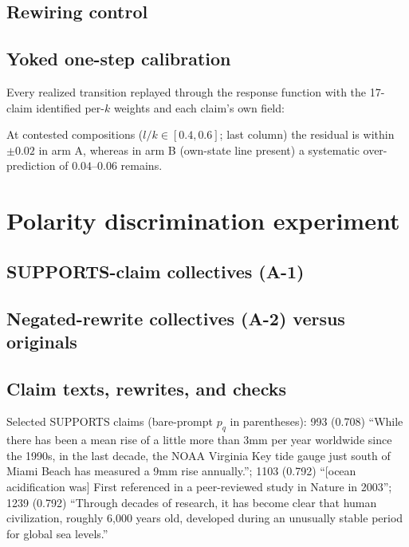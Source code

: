 \documentclass[11pt]{article}
\begin{document}
\subsection{Rewiring control}
\begin{center}

\end{center}

\subsection{Yoked one-step calibration}
Every realized transition replayed through the response function with the
17-claim identified per-$k$ weights and each claim's own field:
\begin{center}
\small

\end{center}
At contested compositions ($l/k \in [0.4, 0.6]$; last column) the residual
is within $\pm 0.02$ in arm A, whereas in arm B (own-state line present) a
systematic over-prediction of $0.04$--$0.06$ remains.

\section{Polarity discrimination experiment}

\subsection{SUPPORTS-claim collectives (A-1)}
\begin{center}

\end{center}

\subsection{Negated-rewrite collectives (A-2) versus originals}
\begin{center}
\small

\end{center}

\subsection{Claim texts, rewrites, and checks}

Selected SUPPORTS claims (bare-prompt $p_q$ in parentheses): 993 (0.708)
``While there has been a mean rise of a little more than 3mm per year
worldwide since the 1990s, in the last decade, the NOAA Virginia Key tide
gauge just south of Miami Beach has measured a 9mm rise annually.''; 1103
(0.792) ``[ocean acidification was] First referenced in a peer-reviewed study
in Nature in 2003''; 1239 (0.792) ``Through decades of research, it has
become clear that human civilization, roughly 6,000 years old, developed
during an unusually stable period for global sea levels.''
\end{document}
